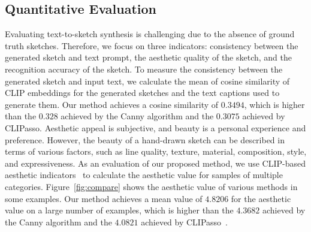 \documentclass{article}
\begin{document}
\subsection{Quantitative Evaluation}
Evaluating text-to-sketch synthesis is challenging due to the absence of ground truth sketches. Therefore, we focus on three indicators: consistency between the generated sketch and text prompt, the aesthetic quality of the sketch, and the recognition accuracy of the sketch.
To measure the consistency between the generated sketch and input text, we calculate the mean of cosine similarity of CLIP embeddings for the generated sketches and the text captions used to generate them. Our method achieves a cosine similarity of $0.3494$, which is higher than the $0.328$ achieved by the Canny algorithm and the $0.3075$ achieved by CLIPasso.
Aesthetic appeal is subjective, and beauty is a personal experience and preference. However, the beauty of a hand-drawn sketch can be described in terms of various factors, such as line quality, texture, material, composition, style, and expressiveness. As an evaluation of our proposed method, we use CLIP-based aesthetic indicators~\cite{aesthetic_predictor} to calculate the aesthetic value for samples of multiple categories. Figure~\ref{fig:compare} shows the aesthetic value of various methods in some examples. Our method achieves a mean value of $4.8206$ for the aesthetic value on a large number of examples, which is higher than the $4.3682$ achieved by the Canny algorithm and the $4.0821$ achieved by CLIPasso~\cite{vinker_2022_clipasso}.
\end{document}
